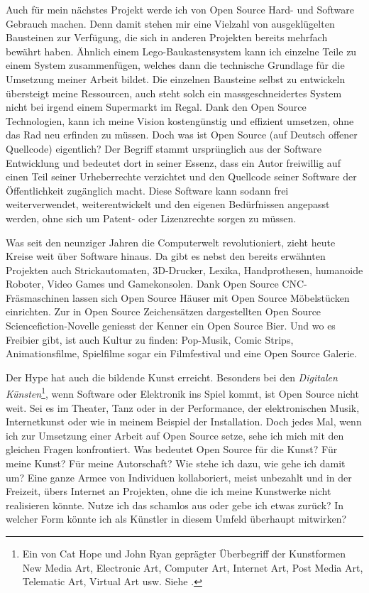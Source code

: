 \documentclass[
paper=164mm:234mm, %
pagesize, %
DIV=calc, %
10pt, %
parskip=half- %
]{scrbook}
\begin{document}
Auch für mein nächstes Projekt werde ich von Open Source Hard- und Software Gebrauch machen. Denn damit stehen mir eine Vielzahl von ausgeklügelten Bausteinen zur Verfügung, die sich in anderen Projekten bereits mehrfach bewährt haben. Ähnlich einem Lego-Baukastensystem kann ich einzelne Teile zu einem System zusammenfügen, welches dann die technische Grundlage für die Umsetzung meiner Arbeit bildet. Die einzelnen Bausteine selbst zu entwickeln übersteigt meine Ressourcen, auch steht solch ein massgeschneidertes System nicht bei irgend einem Supermarkt im Regal. Dank den Open Source Technologien, kann ich meine Vision kostengünstig und effizient umsetzen, ohne das Rad neu erfinden zu müssen. Doch was ist Open Source (auf Deutsch offener Quellcode) eigentlich? Der Begriff stammt ursprünglich aus der Software Entwicklung und bedeutet dort in seiner Essenz, dass ein Autor freiwillig auf einen Teil seiner Urheberrechte verzichtet und den Quellcode seiner Software der Öffentlichkeit zugänglich macht. Diese Software kann sodann frei weiterverwendet, weiterentwickelt und den eigenen Bedürfnissen angepasst werden, ohne sich um Patent- oder Lizenzrechte sorgen zu müssen.

Was seit den neunziger Jahren die Computerwelt revolutioniert, zieht heute Kreise weit über Software hinaus. Da gibt es nebst den bereits erwähnten Projekten auch Strickautomaten, 3D-Drucker, Lexika, Handprothesen, humanoide Roboter, Video Games und Gamekonsolen. Dank Open Source CNC-Fräsmaschinen lassen sich Open Source Häuser mit Open Source Möbelstücken einrichten. Zur in Open Source Zeichensätzen dargestellten Open Source Sciencefiction-Novelle geniesst der Kenner ein Open Source Bier. Und wo es Freibier gibt, ist auch Kultur zu finden: Pop-Musik, Comic Strips, Animationsfilme, Spielfilme sogar ein Filmfestival und eine Open Source Galerie.


Der Hype hat auch die bildende Kunst erreicht. Besonders bei den \emph{Digitalen Künsten}\footnote{Ein von Cat Hope und John Ryan geprägter Überbegriff der Kunstformen  New Media Art, Electronic Art, Computer Art, Internet Art, Post Media Art, Telematic Art, Virtual Art usw. Siehe \cite[3-12]{Hope-Ryan:2014}.}, wenn Software oder Elektronik ins Spiel kommt, ist Open Source nicht weit. Sei es im Theater, Tanz oder in der Performance, der elektronischen Musik, Internetkunst oder wie in meinem Beispiel der Installation. Doch jedes Mal, wenn ich zur Umsetzung einer Arbeit auf Open Source setze, sehe ich mich mit den gleichen Fragen konfrontiert. Was bedeutet Open Source für die Kunst? Für meine Kunst? Für meine Autorschaft? Wie stehe ich dazu, wie gehe ich damit um?
Eine ganze Armee von Individuen kollaboriert, meist unbezahlt und in der Freizeit, übers Internet an Projekten, ohne die ich meine Kunstwerke nicht realisieren könnte. Nutze ich das schamlos aus oder gebe ich etwas zurück? In welcher Form könnte ich als Künstler in diesem Umfeld überhaupt mitwirken?
\end{document}
